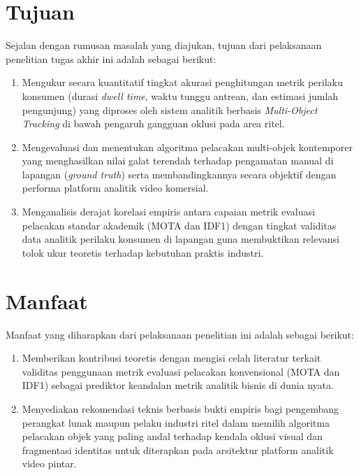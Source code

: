 \section{Tujuan}

Sejalan dengan rumusan masalah yang diajukan, tujuan dari pelaksanaan penelitian tugas akhir ini adalah sebagai berikut:

\begin{enumerate}
    \item Mengukur secara kuantitatif tingkat akurasi penghitungan metrik perilaku konsumen (durasi \textit{dwell time}, waktu tunggu antrean, dan estimasi jumlah pengunjung) yang diproses oleh sistem analitik berbasis \textit{Multi-Object Tracking} di bawah pengaruh gangguan oklusi pada area ritel.
    \item Mengevaluasi dan menentukan algoritma pelacakan multi-objek kontemporer yang menghasilkan nilai galat terendah terhadap pengamatan manual di lapangan (\textit{ground truth}) serta membandingkannya secara objektif dengan performa platform analitik video komersial.
    \item Menganalisis derajat korelasi empiris antara capaian metrik evaluasi pelacakan standar akademik (MOTA dan IDF1) dengan tingkat validitas data analitik perilaku konsumen di lapangan guna membuktikan relevansi tolok ukur teoretis terhadap kebutuhan praktis industri.
\end{enumerate}

\section{Manfaat}

Manfaat yang diharapkan dari pelaksanaan penelitian ini adalah sebagai berikut:

\begin{enumerate}
    \item Memberikan kontribusi teoretis dengan mengisi celah literatur terkait validitas penggunaan metrik evaluasi pelacakan konvensional (MOTA dan IDF1) sebagai prediktor keandalan metrik analitik bisnis di dunia nyata.
    \item Menyediakan rekomendasi teknis berbasis bukti empiris bagi pengembang perangkat lunak maupun pelaku industri ritel dalam memilih algoritma pelacakan objek yang paling andal terhadap kendala oklusi visual dan fragmentasi identitas untuk diterapkan pada arsitektur platform analitik video pintar.
\end{enumerate}